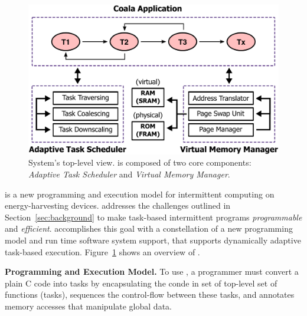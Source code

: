 \begin{figure}
	\centering
	\includegraphics[width=\columnwidth]{figures/overview.pdf}
	\caption{System's top-level view. \sys is composed of two core components: \emph{Adaptive Task Scheduler} and \emph{Virtual Memory Manager}.}
	\label{fig:system_overview}
\end{figure}

\sys is a new programming and execution model for intermittent computing on energy-harvesting devices. \sys addresses the challenges outlined in Section~\ref{sec:background} to make task-based intermittent programs {\em programmable} and {\em efficient}. \sys accomplishes this goal with a constellation of a new programming model and run time software system support, that supports dynamically adaptive task-based execution. Figure~\ref{fig:system_overview} shows an overview of \sys.

\textbf{Programming and Execution Model.}  To use \sys, a programmer must convert a plain C code into tasks by  encapsulating the conde in set of top-level set of functions (tasks), sequences the control-flow between these tasks, and annotates memory accesses that manipulate global data.



